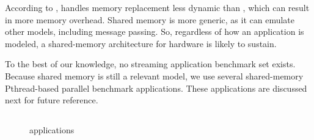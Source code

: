 According to \citet{culler:comp_arch},  handles memory replacement less dynamic than , which can result in more memory overhead.
Shared memory is more generic, as it can emulate other models, including message passing.
So, regardless of how an application is modeled, a shared-memory architecture for hardware is likely to sustain.

To the best of our knowledge, no streaming application benchmark set exists.
Because shared memory is still a relevant model, we use several shared-memory Pthread-based parallel benchmark applications.
These applications are discussed next for future reference.

\subsection{\SPLASH}
\label{s:splash2}

\begin{figure}%
\hfill%
\hfill%
%
\caption{\SPLASH applications}%
\label{fig:splash2}%
\end{figure}

